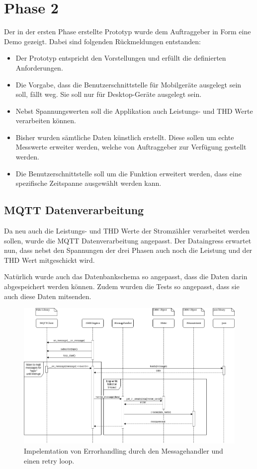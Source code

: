 \section{Phase 2}
Der in der ersten Phase erstellte Prototyp wurde dem Auftraggeber in Form eine Demo gezeigt.
Dabei sind folgenden Rückmeldungen entstanden:
\begin{itemize}
    \item Der Prototyp entspricht den Vorstellungen und erfüllt die definierten Anforderungen.
    \item Die Vorgabe, dass die Benutzerschnittstelle für Mobilgeräte ausgelegt sein soll, fällt weg.
          Sie soll nur für Desktop-Geräte ausgelegt sein.
    \item Nebst Spannungswerten soll die Applikation auch Leistungs- und THD Werte verarbeiten können.
    \item Bisher wurden sämtliche Daten künstlich erstellt.
    Diese sollen um echte Messwerte erweiter werden, welche von Auftraggeber zur Verfügung gestellt werden.
    \item Die Benutzerschnittstelle soll um die Funktion erweitert werden,
    dass eine spezifische Zeitspanne ausgewählt werden kann.



\end{itemize}

\subsection{\ac{MQTT} Datenverarbeitung}

Da neu auch die Leistungs- und THD Werte der Stromzähler verarbeitet werden sollen, wurde
die \ac{MQTT} Datenverarbeitung angepasst. Der Dataingress erwartet nun, dass nebst
den Spannungen der drei Phasen auch noch die Leistung und der THD Wert mitgeschickt wird.

Natürlich wurde auch das Datenbankschema so angepasst, dass die Daten darin abgespeichert
werden können. Zudem wurden die Tests so angepasst, dass sie auch diese Daten
mitsenden.

\begin{figure}[h]
    \centering
    \includegraphics[width=1.0\textwidth]{gfx/dataingress-sequence}
    \caption{
        Impelemtation von Errorhandling durch den Messagehandler und einen
        retry loop.
    }
    \label{fig:dataingress-sequence}
\end{figure}

